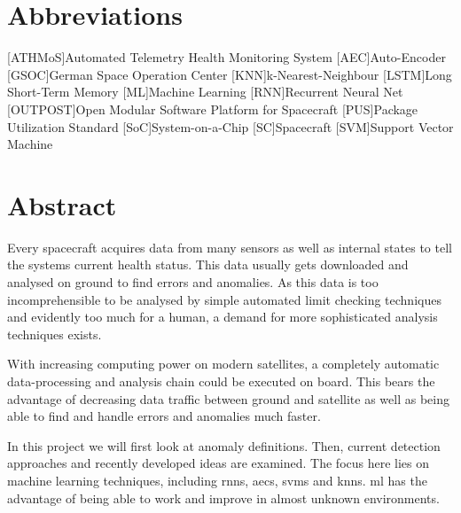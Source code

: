 {\frontmatter
	{\pagestyle{scrheadings}
		\setcounter{page}{1}

\thispagestyle{empty}
		
\thispagestyle{empty}
%		

\tableofcontents

\chapter{Abbreviations}

\begin{acronym}
[ATHMoS]{Automated Telemetry Health Monitoring System}
[AEC]{Auto-Encoder}
[GSOC]{German Space Operation Center}
[KNN]{k-Nearest-Neighbour}
[LSTM]{Long Short-Term Memory}
[ML]{Machine Learning}
[RNN]{Recurrent Neural Net}
[OUTPOST]{Open Modular Software Platform for Spacecraft}
[PUS]{Package Utilization Standard}
[SoC]{System-on-a-Chip}
[SC]{Spacecraft}
[SVM]{Support Vector Machine}
\end{acronym}

{\mainmatter
	\pagestyle{scrheadings}
	
\chapter{Abstract}
Every spacecraft acquires data from many sensors as well as internal states to tell the systems current health status. This data usually gets downloaded and analysed on ground to find errors and anomalies. As this data is too incomprehensible to be analysed by simple automated limit checking techniques and evidently too much for a human, a demand for more sophisticated analysis techniques exists. 

With increasing computing power on modern satellites, a completely automatic data-processing and analysis chain could be executed on board. This bears the advantage of decreasing data traffic between ground and satellite as well as being able to find and handle errors and anomalies much faster.

In this project we will first look at anomaly definitions. Then, current detection approaches and recently developed ideas are examined. The focus here lies on machine learning techniques, including \acp{rnn}, \acp{aec}, \acp{svm} and \acp{knn}. \ac{ml} has the advantage of being able to work and improve in almost unknown environments.

}}}
